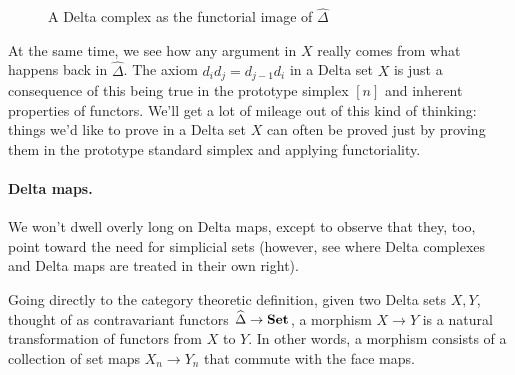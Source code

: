 \documentclass[12pt]{article}
\theoremstyle{plain}
\theoremstyle{definition}
\newcommand{\Set}{\text{\textbf{Set}}}
\begin{document}
\begin{figure}[!htp]
\begin{center}
\end{center}
\caption{A Delta complex as the functorial image of $\widehat \Delta$}\label{F: fig8}
\end{figure}

At the same time, we see how any argument in $X$ really comes from what happens back in $\widehat \Delta$. The axiom $d_id_j=d_{j-1}d_i$ in a Delta set $X$ is just a consequence of this being true in the prototype simplex $[n]$ and inherent properties of functors. We'll get a lot of mileage  out of this kind of thinking: things we'd like to prove in a Delta set $X$ can often be proved just by proving them in the prototype standard simplex and applying functoriality.


\paragraph{Delta maps.}

We won't dwell overly long on Delta maps, except to observe that they, too, point toward the need for simplicial sets (however, see \cite{RSDelta} where Delta complexes and Delta maps are treated in their own right).

Going directly to the category theoretic definition, given two Delta sets $X,Y$, thought of as contravariant functors $\widehat \Delta\to \Set$, a morphism $X\to Y$ is a natural transformation of functors from $X$ to $Y$. In other words, a morphism consists of a collection of set maps $X_n\to Y_n$ that commute with the face maps. 
\end{document}
